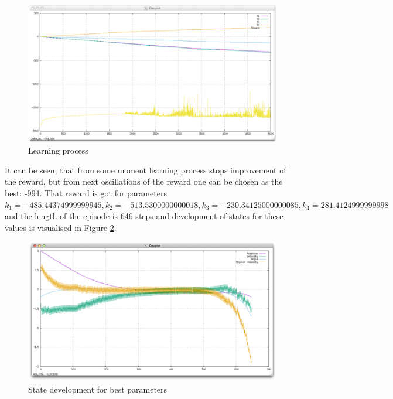 \documentclass[english]{scrartcl}
\begin{document}
\begin{figure}[h]
\centering
\includegraphics{./6-3}
\caption{Learning process}
\label{fig:6-3}
\end{figure}

It can be seen, that from some moment learning process stops improvement of the reward, but from next oscillations of the reward one can be chosen as the best: -994. That reward is got for parameters $k_{1}=-485.44374999999945, k_{2}=-513.5300000000018, k_{3}=-230.34125000000085, k_{4}=281.4124999999998$ and the length of the episode is 646 steps and development of states for these values is visualised in Figure \ref{fig:6-3-the-best}.

\begin{figure}[h]
\centering
\includegraphics{./6-3-the-best}
\caption{State development for best parameters}
\label{fig:6-3-the-best}
\end{figure}
\end{document}
